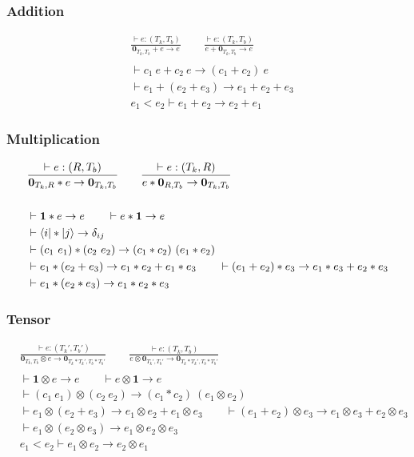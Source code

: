 \subsubsection*{Addition}
\begin{align*}
  & \frac{\vdash e : (T_k, T_b)}{\textbf{0}_{T_k, T_b} + e \to e}
  \qquad \frac{\vdash e : (T_k, T_b)}{e + \textbf{0}_{T_k, T_b}\to e}\\
  &\ \\
  & \vdash c_1\ e + c_2\ e \to (c_1 + c_2)\ e \\
  & \vdash e_1 + (e_2 + e_3) \to e_1 + e_2 + e_3 \\
  & e_1 < e_2 \vdash e_1 + e_2 \to e_2 + e_1
\end{align*}


\subsubsection*{Multiplication}
\begin{align*}
  & \frac{\vdash e : (R, T_b)}{\textbf{0}_{T_k, R} * e \to \textbf{0}_{T_k, T_b}}
  \qquad \frac{\vdash e : (T_k, R)}{e * \textbf{0}_{R, T_b}\to \textbf{0}_{T_k, T_b}}\\
  &\ \\
  & \vdash \mathbf{1} * e \to e
  \qquad
  \vdash e * \mathbf{1} \to e \\
  & \vdash \langle i| * |j\rangle \to \delta_{ij}\\
  & \vdash (c_1\ e_1) * (c_2\ e_2) \to (c_1 * c_2)\ (e_1 * e_2) \\ 
  & \vdash e_1 * (e_2 + e_3) \to e_1 * e_2 + e_1 * e_3
  \qquad \vdash (e_1 + e_2) * e_3 \to e_1 * e_3 + e_2 * e_3 \\
  & \vdash e_1 * (e_2 * e_3) \to e_1 * e_2 * e_3
\end{align*}

\subsubsection*{Tensor}
\begin{align*}
  & \frac{\vdash e : (T_k', T_b')}{\textbf{0}_{T_k, T_b} \otimes e \to \textbf{0}_{T_k * T_k', T_b * T_b'}}
  \qquad \frac{\vdash e : (T_k, T_b)}{e \otimes \textbf{0}_{T_k', T_b'} \to \textbf{0}_{T_k * T_k', T_b * T_b'}}\\
  &\ \\
  & \vdash \mathbf{1} \otimes e \to e
  \qquad
  \vdash e \otimes \mathbf{1} \to e\\
  & \vdash (c_1\ e_1) \otimes (c_2\ e_2) \to (c_1 * c_2)\ (e_1 \otimes e_2)\\
  & \vdash e_1 \otimes (e_2 + e_3) \to e_1 \otimes e_2 + e_1 \otimes e_3
  \qquad \vdash (e_1 + e_2) \otimes e_3 \to e_1 \otimes e_3 + e_2 \otimes e_3\\
  & \vdash e_1 \otimes (e_2 \otimes e_3) \to e_1 \otimes e_2 \otimes e_3\\
  & e_1 < e_2 \vdash e_1 \otimes e_2 \to e_2 \otimes e_1
\end{align*}
  
